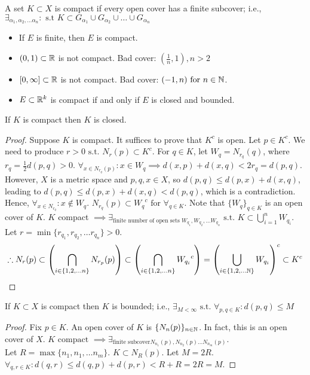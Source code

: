 \begin{definition}[Compact]
	A set $K \subset X$ is compact if every open cover has a finite subcover; i.e., $\exists_{\alpha_1,\alpha_2, \ldots \alpha_n}: \text{ s.t } K \subset G_{\alpha_1} \cup G_{\alpha_2} \cup \ldots  \cup G_{\alpha_n}$
\end{definition}
\begin{example}\hfill
	\begin{itemize}
		\item If $E$ is finite, then $E$ is compact.
		\item $(0,1) \subset \mathbb{R} $ is not compact. Bad cover: $(\frac{1}{n},1), n>2$
		\item $[0, \infty ] \subset \mathbb{R} $ is not compact. Bad cover: $(-1,n) \text{ for } n \in \mathbb{N}$.
		\item $E \subset \mathbb{R}^{k}$ is compact if and only if $E$ is closed and bounded.
	\end{itemize}
\end{example}
\begin{theorem}
	If $K$ is compact then $K$ is closed.
	\begin{proof}
		Suppose $K$ is compact. It suffices to prove that $K^{c}$ is open. Let $ p \in K ^{c}$. We need to produce $r>0 \text{ s.t. } N_r(p) \subset K^{c}$.
		For $q \in K$, let $W_q=N_{r_q}(q)$, where $r_q=\frac{1}{2}d(p,q)>0$.
		$\forall_{x \in N_{r_q}\left(p\right)}: x \in W_q \implies d(x,p)+d(x,q)<2r_q=d(p,q)$. However, $X$ is a metric space and $p,q,x \in X$, so $d(p,q) \le d(p,x)+d(x,q)$, leading to $d(p,q)\le d(p,x)+d(x,q)<d(p,q)$, which is a contradiction.
		Hence, $\forall_{x \in N_{r_q}}: x \not\in W_q$.
		$N_{r_{q}}(p) \subset {W_q}^{c} \text{ for } \forall_{q \in K}$.
		Note that $\{W_q\}_{q \in K} $ is an open cover of $K$.
		$K$ compact $\implies \exists_{\text{finite number of open sets } W_{q_1},W_{q_2}, \ldots W_{q_n}} \text{ s.t. }  K \subset \bigcup_{i=1}^{n}{W_{q_i}}$. Let $r= \min\{r_{q_1},r_{q_2}, \ldots r_{q_n}\}>0$.
		\[
			\therefore {N_r}(p) \subset  \left(\bigcap_{i \in \{1,2, \ldots n\} } N_{r_p}(p)\right)  \subset  \left(\bigcap_{i \in  \{1,2,\ldots n\}} {W_{q_i}}^{c}\right)=\left(\bigcup_{i \in \{1,2,\ldots \mathbb{N} \}}W_{q_i}\right)^{c} \subset K^{c}
		\]
	\end{proof}
\end{theorem}
\begin{theorem}
	If $K \subset X$ is compact then $K$ is bounded; i.e., $\exists_{M< \infty } \text{ s.t. }  \forall_{p,q \in K}: d(p,q) \le M$
	\begin{proof}
		Fix $p \in K$. An open cover of $K$ is $\{N_n(p)\}_{n \in \mathbb{N} }$. In fact, this is an open cover of $X$.
		$K \text{ compact }\implies \exists_{\text{finite subcover} N_{n_1}(p),N_{n_2}(p) \ldots N_{n_m}(p)}$.\\
		Let $R = \max\{n_1,n_1,\ldots n_m\} $. $K \subset N_{R}(p)$. Let $M=2R$. $\forall_{q,r \in K}: d(q,r)\le d(q,p)+d(p,r)<R+R=2R=M$.
	\end{proof}
\end{theorem}
